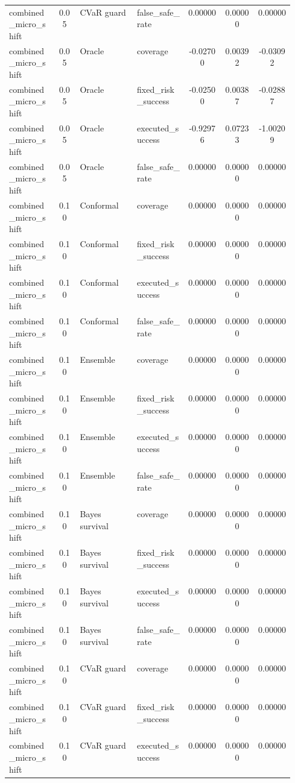 \documentclass{article}
\begin{document}
\begin{center}
\begin{longtable}{p{0.17\linewidth}cp{0.20\linewidth}p{0.18\linewidth}ccc}
combined\_micro\_shift & 0.05 & CVaR guard & false\_safe\_rate & 0.00000 & 0.00000 & 0.00000\\
combined\_micro\_shift & 0.05 & Oracle & coverage & -0.02700 & 0.00392 & -0.03092\\
combined\_micro\_shift & 0.05 & Oracle & fixed\_risk\_success & -0.02500 & 0.00387 & -0.02887\\
combined\_micro\_shift & 0.05 & Oracle & executed\_success & -0.92976 & 0.07233 & -1.00209\\
combined\_micro\_shift & 0.05 & Oracle & false\_safe\_rate & 0.00000 & 0.00000 & 0.00000\\
combined\_micro\_shift & 0.10 & Conformal & coverage & 0.00000 & 0.00000 & 0.00000\\
combined\_micro\_shift & 0.10 & Conformal & fixed\_risk\_success & 0.00000 & 0.00000 & 0.00000\\
combined\_micro\_shift & 0.10 & Conformal & executed\_success & 0.00000 & 0.00000 & 0.00000\\
combined\_micro\_shift & 0.10 & Conformal & false\_safe\_rate & 0.00000 & 0.00000 & 0.00000\\
combined\_micro\_shift & 0.10 & Ensemble & coverage & 0.00000 & 0.00000 & 0.00000\\
combined\_micro\_shift & 0.10 & Ensemble & fixed\_risk\_success & 0.00000 & 0.00000 & 0.00000\\
combined\_micro\_shift & 0.10 & Ensemble & executed\_success & 0.00000 & 0.00000 & 0.00000\\
combined\_micro\_shift & 0.10 & Ensemble & false\_safe\_rate & 0.00000 & 0.00000 & 0.00000\\
combined\_micro\_shift & 0.10 & Bayes survival & coverage & 0.00000 & 0.00000 & 0.00000\\
combined\_micro\_shift & 0.10 & Bayes survival & fixed\_risk\_success & 0.00000 & 0.00000 & 0.00000\\
combined\_micro\_shift & 0.10 & Bayes survival & executed\_success & 0.00000 & 0.00000 & 0.00000\\
combined\_micro\_shift & 0.10 & Bayes survival & false\_safe\_rate & 0.00000 & 0.00000 & 0.00000\\
combined\_micro\_shift & 0.10 & CVaR guard & coverage & 0.00000 & 0.00000 & 0.00000\\
combined\_micro\_shift & 0.10 & CVaR guard & fixed\_risk\_success & 0.00000 & 0.00000 & 0.00000\\
combined\_micro\_shift & 0.10 & CVaR guard & executed\_success & 0.00000 & 0.00000 & 0.00000\\

\end{longtable}
\end{center}
\end{document}
